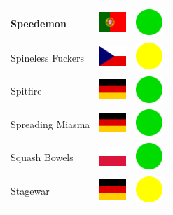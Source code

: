 \documentclass[12pt, a4paper, twoside]{report}
\begin{document}
\begin{center}
\begin{longtable}{|p{5cm}|p{2cm}|p{2cm}|}
 Speedemon                                                  & \includegraphics[width=1cm]{../img/flags/pt} &   \includegraphics[width=1cm]{../likes/y} \\ \hline
 Spineless Fuckers                                          & \includegraphics[width=1cm]{../img/flags/cz} &   \includegraphics[width=1cm]{../likes/m} \\ \hline
 Spitfire                                                   & \includegraphics[width=1cm]{../img/flags/de} &   \includegraphics[width=1cm]{../likes/y} \\ \hline
 Spreading Miasma                                           & \includegraphics[width=1cm]{../img/flags/de} &   \includegraphics[width=1cm]{../likes/y} \\ \hline
 Squash Bowels                                              & \includegraphics[width=1cm]{../img/flags/pl} &   \includegraphics[width=1cm]{../likes/y} \\ \hline
 Stagewar                                                   & \includegraphics[width=1cm]{../img/flags/de} &   \includegraphics[width=1cm]{../likes/m} \\ \hline

\end{longtable}
\end{center}
\end{document}
